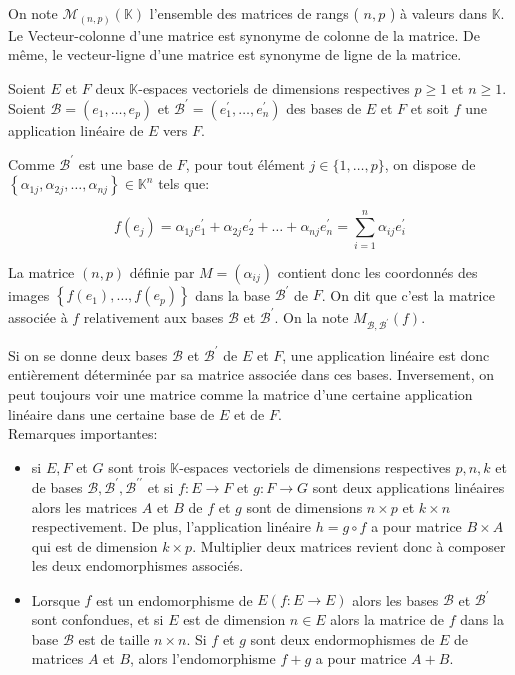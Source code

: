 On note $\mathcal{M}_{(n, p)}(\mathbb{K})$ l'ensemble des matrices de rangs ( $n, p$ ) à valeurs dans $\mathbb{K}$. Le Vecteur-colonne d'une matrice est synonyme de colonne de la matrice. De même, le vecteur-ligne d'une matrice est synonyme de ligne de la matrice.


Soient $E$ et $F$ deux $\mathbb{K}$-espaces vectoriels de dimensions respectives $p \geq 1$ et $n \geq 1$. Soient $\mathcal{B}=\left(e_1, \ldots, e_p\right)$ et $\mathcal{B}^{\prime}=\left(e_1^{\prime}, \ldots, e_n^{\prime}\right)$ des bases de $E$ et $F$ et soit $f$ une application linéaire de $E$ vers $F$.

Comme $\mathcal{B}^{\prime}$ est une base de $F$, pour tout élément $j \in\{1, \ldots, p\}$, on dispose de $\left\{\alpha_{1 j}, \alpha_{2 j}, \ldots, \alpha_{n j}\right\} \in \mathbb{K}^n$ tels que:

$$
f\left(e_j\right)=\alpha_{1 j} e_1^{\prime}+\alpha_{2 j} e_2^{\prime}+\ldots+\alpha_{n j} e_n^{\prime}=\sum_{i=1}^n \alpha_{i j} e_i^{\prime}
$$


La matrice $(n, p)$ définie par $M=\left(\alpha_{i j}\right)$ contient donc les coordonnés des images $\left\{f\left(e_1\right), \ldots, f\left(e_p\right)\right\}$ dans la base $\mathcal{B}^{\prime}$ de $F$. On dit que c'est la matrice associée à $f$ relativement aux bases $\mathcal{B}$ et $\mathcal{B}^{\prime}$. On la note $M_{\mathcal{B}, \mathcal{B}^{\prime}}(f)$.

Si on se donne deux bases $\mathcal{B}$ et $\mathcal{B}^{\prime}$ de $E$ et $F$, une application linéaire est donc entièrement déterminée par sa matrice associée dans ces bases.
Inversement, on peut toujours voir une matrice comme la matrice d'une certaine application linéaire dans une certaine base de $E$ et de $F$.\\

Remarques importantes:
\begin{itemize}
    \item si $E, F$ et $G$ sont trois $\mathbb{K}$-espaces vectoriels de dimensions respectives $p, n, k$ et de bases $\mathcal{B}, \mathcal{B}^{\prime}, \mathcal{B}^{\prime \prime}$ et si $f: E \rightarrow F$ et $g: F \rightarrow G$ sont deux applications linéaires alors les matrices $A$ et $B$ de $f$ et $g$ sont de dimensions $n \times p$ et $k \times n$ respectivement.
    De plus, l'application linéaire $h=g \circ f$ a pour matrice $B \times A$ qui est de dimension $k \times p$. Multiplier deux matrices revient donc à composer les deux endomorphismes associés.
    \item Lorsque $f$ est un endomorphisme de $E(f: E \rightarrow E)$ alors les bases $\mathcal{B}$ et $\mathcal{B}^{\prime}$ sont confondues, et si $E$ est de dimension $n \in E$ alors la matrice de $f$ dans la base $\mathcal{B}$ est de taille $n \times n$. Si $f$ et $g$ sont deux endormophismes de $E$ de matrices $A$ et $B$, alors l'endomorphisme $f+g$ a pour matrice $A+B$.
\end{itemize}

